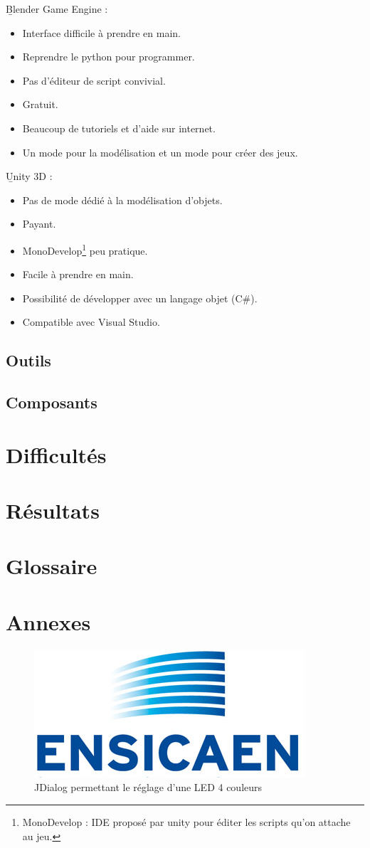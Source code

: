 \documentclass[a4paper,11pt]{myreport}
\begin{document}
  \begin{description}
  	\item \b{Blender Game Engine :}
  	\begin{itemize}
  		\item Interface difficile à prendre en main.
  		\item Reprendre le python pour programmer.
  		\item Pas d'éditeur de script convivial.
  		\item Gratuit.
  		\item Beaucoup de tutoriels et d'aide sur internet.
  		\item Un mode pour la modélisation et un mode pour créer des jeux.
  	\end{itemize}
  	\item \b{Unity 3D :}
  		\begin{itemize}
  			\item Pas de mode dédié à la modélisation d'objets.
  			\item Payant.
  			\item MonoDevelop\footnote{MonoDevelop : IDE proposé par unity pour éditer les scripts qu'on attache au jeu.} peu pratique.
  			\item Facile à prendre en main.
  			\item Possibilité de développer avec un langage objet (C\#).
  			\item Compatible avec Visual Studio.
  		\end{itemize}
  \end{description}

\section{Outils}
\section{Composants}
\chapter{Difficultés}

\chapter{Résultats}

\chapter{Glossaire}

\chapter{Annexes}

\begin{figure}[h]
	\includegraphics[scale=0.70]{./images/LogoEnsicaenSansTexte.jpg}
	\caption{JDialog permettant le réglage d'une LED 4 couleurs}
\end{figure}
\end{document}
